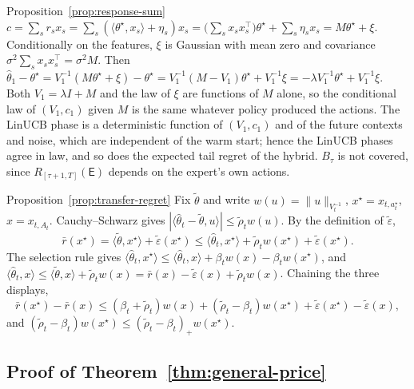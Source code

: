 \documentclass[anon]{alt2027} %
\newcommand{\Exp}{\mathsf{E}}
\newcommand{\wid}{w}
\begin{document}
\begin{proofof}{Proposition~\ref{prop:response-sum}}
$c=\sum_sr_sx_s=\sum_s(\langle\theta^\star,x_s\rangle+\eta_s)x_s
=\bigl(\sum_sx_sx_s^\top\bigr)\theta^\star+\sum_s\eta_sx_s=M\theta^\star+\xi$.
Conditionally on the features, $\xi$ is Gaussian with mean zero and covariance
$\sigma^2\sum_sx_sx_s^\top=\sigma^2M$. Then
$\widehat\theta_1-\theta^\star=V_1^{-1}(M\theta^\star+\xi)-\theta^\star
=V_1^{-1}(M-V_1)\theta^\star+V_1^{-1}\xi=-\lambda V_1^{-1}\theta^\star+V_1^{-1}\xi$.
Both $V_1=\lambda I+M$ and the law of $\xi$ are functions of $M$ alone, so the
conditional law of $(V_1,c_1)$ given $M$ is the same whatever policy produced
the actions. The LinUCB phase is a deterministic function of $(V_1,c_1)$ and of
the future contexts and noise, which are independent of the warm start; hence
the LinUCB phases agree in law, and so does the expected tail regret of the
hybrid. $B_\tau$ is not covered, since $R_{[\tau+1,T]}(\Exp)$ depends on the
expert's own actions.
\end{proofof}

\begin{proofof}{Proposition~\ref{prop:transfer-regret}}
Fix $\widetilde\theta$ and write $\wid(u)=\|u\|_{V_t^{-1}}$,
$x^\star=x_{t,a^\star_t}$, $x=x_{t,A_t}$. Cauchy--Schwarz gives
$|\langle\widehat\theta_t-\widetilde\theta,u\rangle|\le\widetilde\rho_t\wid(u)$.
By the definition of $\widetilde\varepsilon$,
\[
\bar r(x^\star)=\langle\widetilde\theta,x^\star\rangle+\widetilde\varepsilon(x^\star)
\le\langle\widehat\theta_t,x^\star\rangle+\widetilde\rho_t\wid(x^\star)+\widetilde\varepsilon(x^\star).
\]
The selection rule gives
$\langle\widehat\theta_t,x^\star\rangle\le\langle\widehat\theta_t,x\rangle+\beta_t\wid(x)-\beta_t\wid(x^\star)$,
and
$\langle\widehat\theta_t,x\rangle\le\langle\widetilde\theta,x\rangle+\widetilde\rho_t\wid(x)
=\bar r(x)-\widetilde\varepsilon(x)+\widetilde\rho_t\wid(x)$.
Chaining the three displays,
\[
\bar r(x^\star)-\bar r(x)\le(\beta_t+\widetilde\rho_t)\wid(x)
+(\widetilde\rho_t-\beta_t)\wid(x^\star)
+\widetilde\varepsilon(x^\star)-\widetilde\varepsilon(x),
\]
and $(\widetilde\rho_t-\beta_t)\wid(x^\star)\le(\widetilde\rho_t-\beta_t)_+\wid(x^\star)$.
\end{proofof}

\subsection{Proof of Theorem~\ref{thm:general-price}}
\label{app:proof-general-price}
\end{document}

